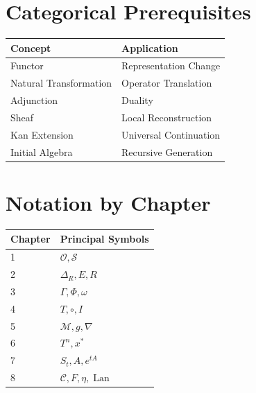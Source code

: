 \documentclass[11pt]{book}
\numberwithin{equation}{chapter}
\theoremstyle{definition}
\theoremstyle{plain}
\begin{document}

\section{Categorical Prerequisites}

\begin{center}

\begin{tabular}{ll}

Concept &
Application
\\
\hline

Functor &
Representation Change
\\

Natural Transformation &
Operator Translation
\\

Adjunction &
Duality
\\

Sheaf &
Local Reconstruction
\\

Kan Extension &
Universal Continuation
\\

Initial Algebra &
Recursive Generation

\end{tabular}

\end{center}


\section{Notation by Chapter}

\begin{center}

\begin{tabular}{ll}

Chapter &
Principal Symbols
\\
\hline

1 &
$\mathcal O,\mathcal S$
\\

2 &
$\Delta_R,E,R$
\\

3 &
$\Gamma,\Phi,\omega$
\\

4 &
$T,\circ,I$
\\

5 &
$\mathcal M,g,\nabla$
\\

6 &
$T^n,x^*$
\\

7 &
$S_t,A,e^{tA}$
\\

8 &
$\mathcal C,F,\eta,\operatorname{Lan}$

\end{tabular}

\end{center}
\end{document}
